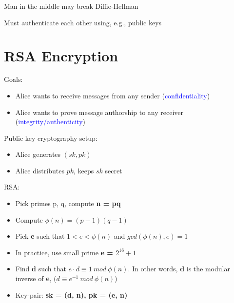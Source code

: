 \documentclass[11pt]{article}
\begin{document}
\begin{tcolorbox}[
  colback=red!15,     %
  colframe=black!50,    %
  boxrule=1pt,       %
  arc=3mm,             %
  left=4mm, right=4mm, top=2mm, bottom=2mm %
]
Man in the middle may break Diffie-Hellman
\end{tcolorbox}

\begin{tcolorbox}[
  colback=green!15,     %
  colframe=black!50,    %
  boxrule=1pt,       %
  arc=3mm,             %
  left=4mm, right=4mm, top=2mm, bottom=2mm %
]
Must authenticate each other using, e.g., public keys
\end{tcolorbox}

\section*{RSA Encryption}
Goals:

\begin{itemize}
	\item Alice wants to receive messages from any sender (\textcolor{blue}{confidentiality})
	\item Alice wants to prove message authorship to any receiver (\textcolor{blue}{integrity/authenticity})
\end{itemize}

Public key cryptography setup:
\begin{itemize}
	\item Alice generates $(sk, pk)$
	\item Alice distributes $pk$, keeps  $sk$ secret
\end{itemize}

RSA:
\begin{itemize}
	\item Pick primes p, q, compute \textbf{n = pq}
	\item Compute  $\phi(n) = (p-1)(q-1)$
	\item Pick \textbf{e} such that $1 < e < \phi(n)$ and  $gcd(\phi(n), e) = 1$
	\item In practice, use small prime  \textbf{e = $2^{16} + 1$}
	\item Find \textbf{d} such that $e \cdot d \equiv 1 \  mod \ \phi(n)$. In other words, \textbf{d} is the modular inverse of \textbf{e}, ($d \equiv e^{-1} \ mod \ \phi(n)$)
	\item Key-pair: \textbf{sk = (d, n), pk = (e, n)}
\end{itemize}
\end{document}
